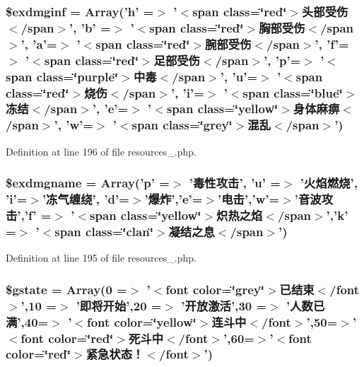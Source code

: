 \hypertarget{cache_2resources__1_8php_a2de6851aa38cafa604576a1dc520e631}{
\subsubsection[{\$exdmginf}]{\setlength{\rightskip}{0pt plus 5cm}\$exdmginf = Array('h' =$>$ '$<$span class=\char`\"{}red\char`\"{}$>$头部受伤$<$/span$>$', 'b' =$>$ '$<$span class=\char`\"{}red\char`\"{}$>$胸部受伤$<$/span$>$', 'a'=$>$ '$<$span class=\char`\"{}red\char`\"{}$>$腕部受伤$<$/span$>$', 'f'=$>$ '$<$span class=\char`\"{}red\char`\"{}$>$足部受伤$<$/span$>$', 'p'=$>$ '$<$span class=\char`\"{}purple\char`\"{}$>$中毒$<$/span$>$', 'u'=$>$ '$<$span class=\char`\"{}red\char`\"{}$>$烧伤$<$/span$>$', 'i'=$>$ '$<$span class=\char`\"{}blue\char`\"{}$>$冻结$<$/span$>$', 'e'=$>$ '$<$span class=\char`\"{}yellow\char`\"{}$>$身体麻痹$<$/span$>$', 'w'=$>$ '$<$span class=\char`\"{}grey\char`\"{}$>$混乱$<$/span$>$')}}\label{cache_2resources__1_8php_a2de6851aa38cafa604576a1dc520e631}


Definition at line 196 of file resources\+\_.\+php.

\hypertarget{cache_2resources__1_8php_ae3d186083abb3ad845df2562e1c1df79}{
\subsubsection[{\$exdmgname}]{\setlength{\rightskip}{0pt plus 5cm}\$exdmgname = Array('p' =$>$ '毒性攻击', 'u' =$>$ '火焰燃烧', 'i'=$>$'冻气缠绕', 'd'=$>$'爆炸','e'=$>$'电击','w'=$>$'音波攻击','f' =$>$ '$<$span class=\char`\"{}yellow\char`\"{}$>$炽热之焰$<$/span$>$','k' =$>$ '$<$span class=\char`\"{}clan\char`\"{}$>$凝结之息$<$/span$>$')}}\label{cache_2resources__1_8php_ae3d186083abb3ad845df2562e1c1df79}


Definition at line 195 of file resources\+\_.\+php.

\hypertarget{cache_2resources__1_8php_a5aed3a3ce44a1f7125854d31c7f61a6b}{
\subsubsection[{\$gstate}]{\setlength{\rightskip}{0pt plus 5cm}\$gstate = Array(0 =$>$ '$<$font color=\char`\"{}grey\char`\"{}$>$已结束$<$/font$>$',10 =$>$ '即将开始',20 =$>$ '开放激活',30 =$>$ '人数已满',40=$>$ '$<$font color=\char`\"{}yellow\char`\"{}$>$连斗中$<$/font$>$',50=$>$'$<$font color=\char`\"{}red\char`\"{}$>$死斗中$<$/font$>$',60=$>$'$<$font color=\char`\"{}red\char`\"{}$>$紧急状态！$<$/font$>$')}}\label{cache_2resources__1_8php_a5aed3a3ce44a1f7125854d31c7f61a6b}


